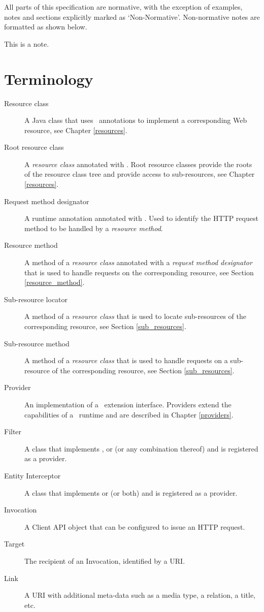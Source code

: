 All parts of this specification are normative, with the exception of examples, notes and sections explicitly marked as `Non-Normative'. Non-normative notes are formatted as shown below.

\begin{nnnote*}
This is a note.
\end{nnnote*}

\section{Terminology}
\label{terminology}

\begin{description}
\item[Resource class] A Java class that uses \jaxrs\ annotations to implement a corresponding Web resource, see Chapter \ref{resources}.
\item[Root resource class] A {\em resource class} annotated with \Path. Root resource classes provide the roots of the resource class tree and provide access to sub-resources, see Chapter \ref{resources}.
\item[Request method designator] A runtime annotation annotated with \HttpMethod. Used to identify the HTTP request method to be handled by a {\em resource method}.
\item[Resource method] A method of a {\em resource class} annotated with a {\em request method designator} that is used to handle requests on the corresponding resource, see Section \ref{resource_method}.
\item[Sub-resource locator] A method of a {\em resource class} that is used to locate sub-resources of the corresponding resource, see Section \ref{sub_resources}.
\item[Sub-resource method] A method of a {\em resource class} that is used to handle requests on a sub-resource of the corresponding resource, see Section \ref{sub_resources}.
\item[Provider] An implementation of a \jaxrs\ extension interface. Providers extend the capabilities of a \jaxrs\ runtime and are described in Chapter \ref{providers}.
\item[Filter] A class that implements ,  or  (or any combination thereof) and is registered as a provider.
\item[Entity Interceptor] A class that implements  or  (or both) and is registered as a provider.
\item[Invocation] A Client API object that can be configured to issue an HTTP request.
\item[Target] The recipient of an Invocation, identified by a URI.
\item[Link] A URI with additional meta-data such as a media type, a relation, a title, etc.

\end{description}

